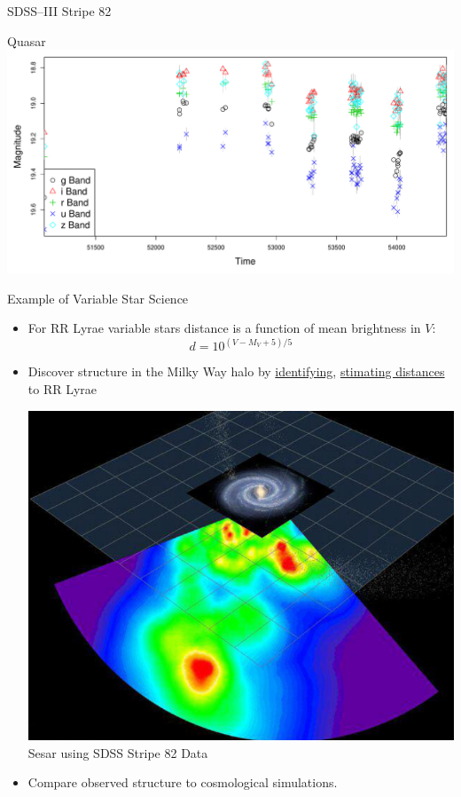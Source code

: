 \documentclass[12pt]{beamer}
\begin{document}
\begin{frame}{SDSS--III Stripe 82 \cite{ivezic2007sloan}}
\begin{center}
Quasar\\
\includegraphics[scale=.15]{figs/unfolded_7904669.pdf}
\end{center}


\end{frame}


\begin{frame}{Example of Variable Star Science}
\begin{itemize}
\item For RR Lyrae variable stars distance is a function of mean brightness in $V$:
\begin{equation*}
d = 10^{(V-M_V +5)/5}
\end{equation*}
\item Discover structure in the Milky Way halo by \underline{identifying}, \underline{stimating distances} to RR Lyrae


\begin{center}
\includegraphics[scale=.2]{figs/sesar_map.png}\\
\footnotesize{Sesar \cite{sesar2010light} using SDSS Stripe 82 Data}
\end{center}

\item Compare observed structure to cosmological simulations.

\end{itemize}

\end{frame}
\end{document}

